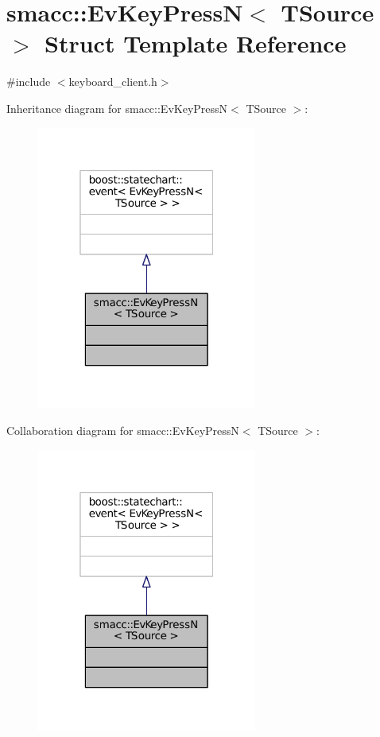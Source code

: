 \hypertarget{structsmacc_1_1EvKeyPressN}{}\section{smacc\+:\+:Ev\+Key\+PressN$<$ T\+Source $>$ Struct Template Reference}
\label{structsmacc_1_1EvKeyPressN}


{\ttfamily \#include $<$keyboard\+\_\+client.\+h$>$}



Inheritance diagram for smacc\+:\+:Ev\+Key\+PressN$<$ T\+Source $>$\+:
\nopagebreak
\begin{figure}[H]
\begin{center}
\leavevmode
\includegraphics[width=205pt]{structsmacc_1_1EvKeyPressN__inherit__graph}
\end{center}
\end{figure}


Collaboration diagram for smacc\+:\+:Ev\+Key\+PressN$<$ T\+Source $>$\+:
\nopagebreak
\begin{figure}[H]
\begin{center}
\leavevmode
\includegraphics[width=205pt]{structsmacc_1_1EvKeyPressN__coll__graph}
\end{center}
\end{figure}


